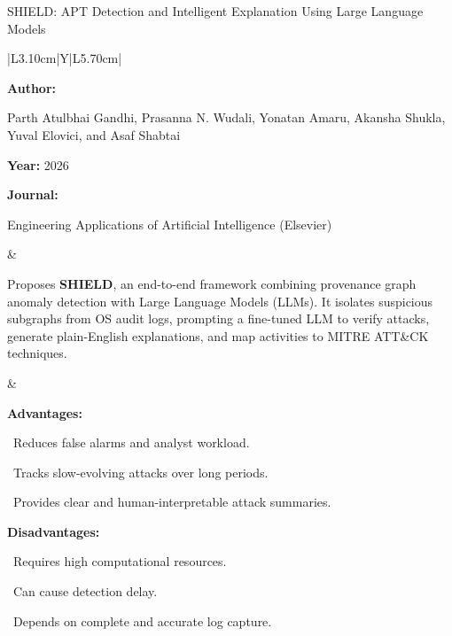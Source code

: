\begin{frame}[t]{SHIELD: APT Detection and Intelligent Explanation Using Large Language Models}
\vspace{-0.30em}
{\footnotesize\setlength{\tabcolsep}{3.5pt}\renewcommand{\arraystretch}{1.10}
\begin{tabularx}{\textwidth}{|L{3.10cm}|Y|L{5.70cm}|}
\hline\lrhdr\hline
\begin{minipage}[t]{\linewidth}\fontsize{7.2pt}{9.2pt}\raggedright\selectfont
\textbf{Author:}\par
Parth Atulbhai Gandhi, Prasanna N. Wudali, Yonatan Amaru, Akansha Shukla, Yuval Elovici, and Asaf Shabtai\par\vspace{4pt}
\textbf{Year:} 2026\par\vspace{4pt}
\textbf{Journal:}\par
Engineering Applications of Artificial Intelligence (Elsevier)\par\vspace{4pt}
\end{minipage}
&
\begin{minipage}[t]{\linewidth}\fontsize{7.2pt}{9.2pt}\raggedright\selectfont
Proposes \textbf{SHIELD}, an end-to-end framework combining provenance graph anomaly detection with Large Language Models (LLMs). It isolates suspicious subgraphs from OS audit logs, prompting a fine-tuned LLM to verify attacks, generate plain-English explanations, and map activities to MITRE ATT\&CK techniques.\par\vspace{4pt}
\end{minipage}
&
\begin{minipage}[t]{\linewidth}\fontsize{7.1pt}{8.8pt}\raggedright\selectfont
\textcolor{strengthGreen}{\textbf{Advantages:}}\par\vspace{1.3pt}
\textbullet~Reduces false alarms and analyst workload.\par\vspace{1.8pt}\textbullet~Tracks slow-evolving attacks over long periods.\par\vspace{1.8pt}\textbullet~Provides clear and human-interpretable attack summaries.\par\vspace{3.2pt}
\textcolor{limitRed}{\textbf{Disadvantages:}}\par\vspace{1.3pt}
\textbullet~Requires high computational resources.\par\vspace{1.8pt}\textbullet~Can cause detection delay.\par\vspace{1.8pt}\textbullet~Depends on complete and accurate log capture.\par\vspace{3pt}
\end{minipage} \\\hline
\end{tabularx}}
\end{frame}

